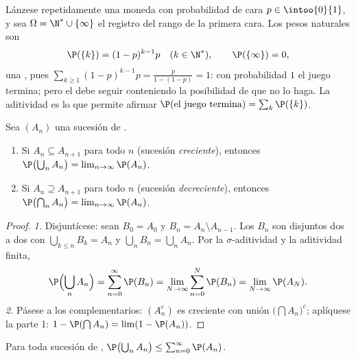 \begin{example}\label{ex:b2:proba:geometric}
Lánzese repetidamente una moneda con probabilidad de cara $p \in
\intoo{0}{1}$, y sea $\Omega = \N^* \cup \{\infty\}$ el registro del
rango de la primera cara. Los pesos naturales son
\[
\P(\{k\}) = (1 - p)^{k-1}p
\quad (k \in \N^*),
\qquad
\P(\{\infty\}) = 0 ,
\]
una , pues $\sum_{k\geq1}(1-p)^{k-1}p =
\frac{p}{1 - (1-p)} = 1$: con probabilidad $1$ el juego termina;
pero el  debe seguir conteniendo la posibilidad de que
no lo haga. La aditividad  es lo que permite afirmar
$\P(\text{el juego termina}) = \sum_k \P(\{k\})$.
\end{example}

\begin{theorem}\label{thm:b2:proba:continuity}
Sea $(A_n)$ una sucesión de .
\begin{enumerate}
\item Si $A_n \subseteq A_{n+1}$ para todo $n$ (sucesión
\emph{creciente}), entonces $\P\bigl(\bigcup_n A_n\bigr) =
\lim_{n\to\infty} \P(A_n)$.
\item Si $A_n \supseteq A_{n+1}$ para todo $n$ (sucesión
\emph{decreciente}), entonces $\P\bigl(\bigcap_n A_n\bigr) =
\lim_{n\to\infty} \P(A_n)$.
\end{enumerate}
\end{theorem}

\begin{proof}
\emph{1.} Disjuntícese: sean $B_0 = A_0$ y $B_n = A_n \setminus
A_{n-1}$. Los $B_n$ son disjuntos dos a dos con $\bigcup_{k \leq n}
B_k = A_n$ y $\bigcup_n B_n = \bigcup_n A_n$. Por la
$\sigma$-aditividad y la aditividad finita,
\[
\P\Bigl(\bigcup_n A_n\Bigr)
= \sum_{n=0}^\infty \P(B_n)
= \lim_{N\to\infty}\sum_{n=0}^N \P(B_n)
= \lim_{N\to\infty}\P(A_N) .
\]
\emph{2.} Pásese a los complementarios: $(A_n^c)$ es creciente con
unión $\bigl(\bigcap A_n\bigr)^c$; aplíquese la parte 1: $1 -
\P(\bigcap A_n) = \lim (1 - \P(A_n))$.
\end{proof}

\begin{corollary}\label{cor:b2:proba:subadd}
Para toda sucesión de , $\P\bigl(\bigcup_n A_n\bigr) \leq
\sum_{n=0}^\infty \P(A_n)$.
\end{corollary}

